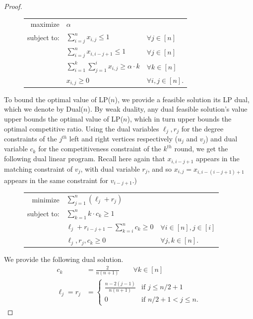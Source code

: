 \begin{proof}
\begin{figure}[h]
	\begin{center}
		\begin{tabular}{rll}
			maximize & $\alpha$ \\
			subject to: & $\sum_{i=j}^n x_{i,j}\leq 1$ & $\forall j\in [n]$ \\
			& $\sum_{i=j}^n x_{i,i-j+1}\leq 1$ & $\forall j\in [n]$ \\
			& $\sum_{i=1}^k \sum_{j=1}^i x_{i,j} \geq \alpha \cdot k$ & $\forall k\in [n]$ \\
			& $x_{i,j}\geq 0$ & $\forall i,j\in [n]$.
		\end{tabular}
	\end{center}
	\vspace{-0.5cm}
\end{figure} 

To bound the optimal value of LP($n$), we provide a feasible solution its LP dual, which we denote by Dual($n$). By weak duality, any dual feasible solution's value upper bounds the optimal value of LP($n$), which in turn upper bounds the optimal competitive ratio. Using the dual variables $\ell_j, r_j$ for the degree constraints of the $j^{th}$ left and right vertices respectively ($u_j$ and $v_j$) and dual variable $c_k$ for the competitiveness constraint of the $k^{th}$ round, we get the following dual linear program. Recall here again that $x_{i,i-j+1}$ appears in the matching constraint of $v_j$, with dual variable $r_j$, and so $x_{i,j}=x_{i,i-(i-j+1)+1}$ appears in the same constraint for $v_{i-j+1}$.)
\begin{figure}[h]
	\begin{center}
		\begin{tabular}{rll}
			minimize & $\sum_{j=1}^n \left( \ell_j+r_j \right)$ \\
			subject to: & $\sum_{k=1}^n k\cdot c_k \geq 1$  \\
			& $ \ell_j + r_{i-j+1} - \sum_{k=i}^n  c_k \geq 0$ & $\forall i\in [n], j \in [i]$ \\
			& $\ell_j, r_j, c_k \geq 0$ & $\forall j,k\in [n]$.
		\end{tabular}
	\end{center}
	\vspace{-0.3cm}
\end{figure} 

We provide the following dual  solution.
\begin{align*}
c_k &= \frac{2}{n(n+1)} \qquad \forall k \in [n]\\
\ell_j = r_j  & = \begin{cases} 
\frac{n-2(j-1)}{n(n+1)} & \mbox{if } j \leq n/2 +1 \\
0 & \mbox{if } n/2 +1 < j \leq n. \end{cases}
\end{align*}


\end{proof}
